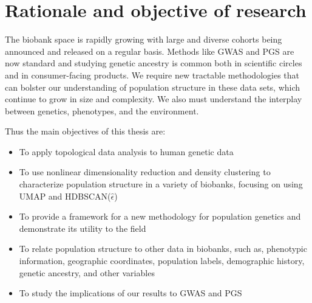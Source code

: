 \section{Rationale and objective of research}

The biobank space is rapidly growing with large and diverse cohorts being announced and released on a regular basis. Methods like GWAS and PGS are now standard and studying genetic ancestry is common both in scientific circles and in consumer-facing products. We require new tractable methodologies that can bolster our understanding of population structure in these data sets, which continue to grow in size and complexity. We also must understand the interplay between genetics, phenotypes, and the environment. 

Thus the main objectives of this thesis are:
\begin{itemize}
\item To apply topological data analysis to human genetic data
\item To use nonlinear dimensionality reduction and density clustering to characterize population structure in a variety of biobanks, focusing on using UMAP and HDBSCAN($\hat{\epsilon}$)
\item To provide a framework for a new methodology for population genetics and demonstrate its utility to the field
\item To relate population structure to other data in biobanks, such as, phenotypic information, geographic coordinates, population labels, demographic history, genetic ancestry, and other variables
\item To study the implications of our results to GWAS and PGS
\end{itemize}

\clearpage